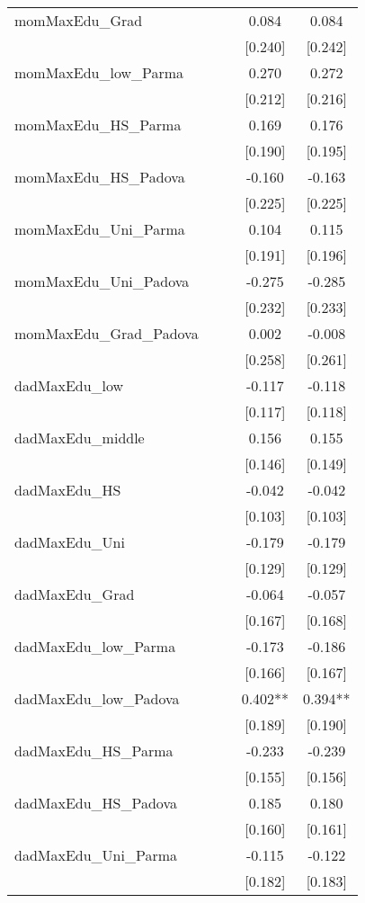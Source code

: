 \documentclass[]{article}
\begin{document}
\begin{tabular}{lcccc}
momMaxEdu\_Grad &  &  & 0.084 & 0.084 \\
 &  &  & [0.240] & [0.242] \\
momMaxEdu\_low\_Parma &  &  & 0.270 & 0.272 \\
 &  &  & [0.212] & [0.216] \\
momMaxEdu\_HS\_Parma &  &  & 0.169 & 0.176 \\
 &  &  & [0.190] & [0.195] \\
momMaxEdu\_HS\_Padova &  &  & -0.160 & -0.163 \\
 &  &  & [0.225] & [0.225] \\
momMaxEdu\_Uni\_Parma &  &  & 0.104 & 0.115 \\
 &  &  & [0.191] & [0.196] \\
momMaxEdu\_Uni\_Padova &  &  & -0.275 & -0.285 \\
 &  &  & [0.232] & [0.233] \\
momMaxEdu\_Grad\_Padova &  &  & 0.002 & -0.008 \\
 &  &  & [0.258] & [0.261] \\
dadMaxEdu\_low &  &  & -0.117 & -0.118 \\
 &  &  & [0.117] & [0.118] \\
dadMaxEdu\_middle &  &  & 0.156 & 0.155 \\
 &  &  & [0.146] & [0.149] \\
dadMaxEdu\_HS &  &  & -0.042 & -0.042 \\
 &  &  & [0.103] & [0.103] \\
dadMaxEdu\_Uni &  &  & -0.179 & -0.179 \\
 &  &  & [0.129] & [0.129] \\
dadMaxEdu\_Grad &  &  & -0.064 & -0.057 \\
 &  &  & [0.167] & [0.168] \\
dadMaxEdu\_low\_Parma &  &  & -0.173 & -0.186 \\
 &  &  & [0.166] & [0.167] \\
dadMaxEdu\_low\_Padova &  &  & 0.402** & 0.394** \\
 &  &  & [0.189] & [0.190] \\
dadMaxEdu\_HS\_Parma &  &  & -0.233 & -0.239 \\
 &  &  & [0.155] & [0.156] \\
dadMaxEdu\_HS\_Padova &  &  & 0.185 & 0.180 \\
 &  &  & [0.160] & [0.161] \\
dadMaxEdu\_Uni\_Parma &  &  & -0.115 & -0.122 \\
 &  &  & [0.182] & [0.183] \\

\end{tabular}
\end{document}

